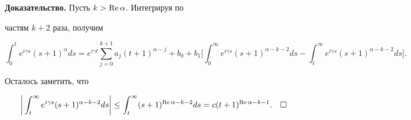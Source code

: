 {\bf Доказательство.} Пусть $k>\operatorname{Re} \alpha$. Интегрируя по


частям $k+2$ раза, получим


$$


\int_0^t e^{i \gamma s}(s+1)^{\alpha}ds=e^{i \gamma t}


\sum\limits_{j=0}^{k+1} a_j (t+1)^{\alpha-j}+b_0+


b_1 \bigg[\int_0^\infty e^{i \gamma s}(s+1)^{\alpha-k-2}ds-


\int_t^\infty e^{i \gamma s}(s+1)^{\alpha-k-2}ds \bigg].


$$


Осталось заметить, что


$$


\bigg|\int_t^\infty e^{i \gamma s}(s+1)^{\alpha-k-2}ds \bigg|\le


\int_t^\infty (s+1)^{\re \alpha-k-2}ds=


c (t+1)^{\re \alpha-k-1}.\quad\square


$$





